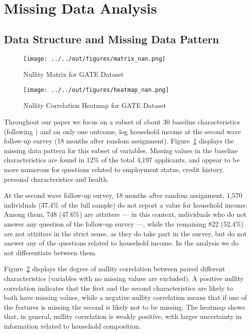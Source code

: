
\section{Missing Data Analysis}
\label{sec:missing_analysis}
\subsection{Data Structure and Missing Data Pattern}

\begin{figure}[t]
    \caption{Nullity Matrix for GATE Dataset}
    \texttt{[image: ../../out/figures/matrix\_nan.png]}
    \label{fig:matrix_nan}
\end{figure}

\begin{figure}[t]
    \caption{Nullity Correlation Heatmap for GATE Dataset}
    \texttt{[image: ../../out/figures/heatmap\_nan.png]}
    \label{fig:heatmap_nan}
\end{figure}

Throughout our paper we focus on a subset of about 30 baseline characteristics (following \cite{fairlie2015behind}) and on only one outcome, log household income at the second wave follow-up survey (18 months after random assignment). Figure~\ref{fig:matrix_nan} displays the missing data pattern for this subset of variables. Missing values in the baseline characteristics are found in 12\% of the total 4,197 applicants, and appear to be more numerous for questions related to employment status, credit history, personal characteristics and health.

At the second wave follow-up survey, 18 months after random assignment, 1,570 individuals (37.4\% of the full sample) do not report a value for household income. Among them, 748 (47.6\%) are attriters --- in this context, individuals who do not answer any question of the follow-up survey ---, while the remaining 822 (52.4\%) are not attriters in the strict sense, as they do take part in the survey, but do not answer any of the questions related to household income. In the analysis we do not differentiate between them.

Figure~\ref{fig:heatmap_nan} displays the degree of nullity correlation between paired different characteristics (variables with no missing values are excluded). A positive nullity correlation indicates that the first and the second characteristics are likely to both have missing values, while a negative nullity correlation means that if one of the features is missing the second is likely not to be missing. The heatmap shows that, in general, nullity correlation is weakly positive, with larger uncertainty in information related to household composition.

